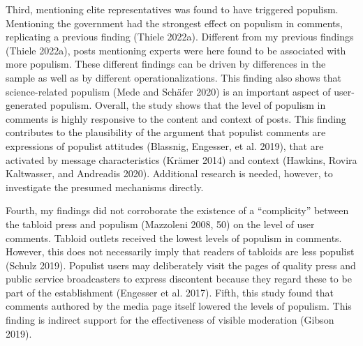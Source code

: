 \documentclass[
]{ccr}
\begin{document}
Third, mentioning elite representatives was found to have triggered
populism. Mentioning the government had the strongest effect on populism
in comments, replicating a previous finding (Thiele 2022a). Different
from my previous findings (Thiele 2022a), posts mentioning experts were
here found to be associated with more populism. These different findings
can be driven by differences in the sample as well as by different
operationalizations. This finding also shows that science-related
populism (Mede and Schäfer 2020) is an important aspect of
user-generated populism. Overall, the study shows that the level of
populism in comments is highly responsive to the content and context of
posts. This finding contributes to the plausibility of the argument that
populist comments are expressions of populist attitudes (Blassnig,
Engesser, et al. 2019), that are activated by message characteristics
(Krämer 2014) and context (Hawkins, Rovira Kaltwasser, and Andreadis
2020). Additional research is needed, however, to investigate the
presumed mechanisms directly.

Fourth, my findings did not corroborate the existence of a
``complicity'' between the tabloid press and populism (Mazzoleni 2008,
50) on the level of user comments. Tabloid outlets received the lowest
levels of populism in comments. However, this does not necessarily imply
that readers of tabloids are less populist (Schulz 2019). Populist users
may deliberately visit the pages of quality press and public service
broadcasters to express discontent because they regard these to be part
of the establishment (Engesser et al. 2017). Fifth, this study found
that comments authored by the media page itself lowered the levels of
populism. This finding is indirect support for the effectiveness of
visible moderation (Gibson 2019).
\end{document}
